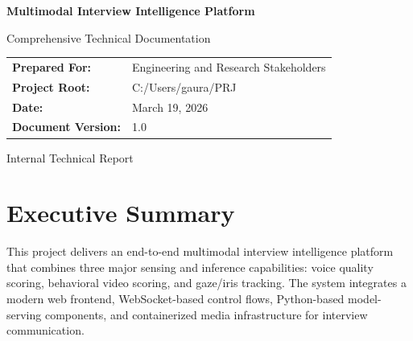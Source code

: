 \documentclass[12pt,a4paper]{report}
\begin{document}
\begin{titlepage}
    \centering
    \vspace*{1.8cm}
    {\Huge\bfseries Multimodal Interview Intelligence Platform\par}
    \vspace{0.8cm}
    {\LARGE Comprehensive Technical Documentation\par}
    \vspace{1.2cm}


    \vfill

    \begin{tabular}{ll}
        \textbf{Prepared For:} & Engineering and Research Stakeholders \\
        \textbf{Project Root:} & C:/Users/gaura/PRJ \\
        \textbf{Date:} & March 19, 2026 \\
        \textbf{Document Version:} & 1.0
    \end{tabular}

    \vfill

    {\large Internal Technical Report}\par
\end{titlepage}


\chapter*{Executive Summary}
This project delivers an end-to-end multimodal interview intelligence platform that combines three major sensing and inference capabilities: voice quality scoring, behavioral video scoring, and gaze/iris tracking. The system integrates a modern web frontend, WebSocket-based control flows, Python-based model-serving components, and containerized media infrastructure for interview communication.
\end{document}
